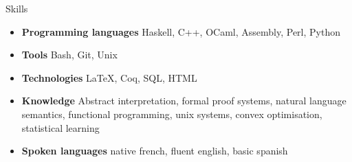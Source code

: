\documentclass[a4paper,14pt]{extarticle}
\newcommand{\cvtitle}[1]{
    \begin{tcolorbox}[colback=bgcol,colframe=ForestGreen,
        height=1cm, valign=center, sharp corners=downhill]
        {\Large #1}
    \end{tcolorbox}
}
\begin{document}
\begin{minipage}[c][282mm][t]{0.60\linewidth}
        \cvtitle{Skills}

        \begin{itemize}
            \item \textbf{Programming languages} Haskell, C++, OCaml, Assembly, Perl, Python
            \item \textbf{Tools} Bash, Git, Unix
            \item \textbf{Technologies} \LaTeX, Coq, SQL, HTML
            \item \textbf{Knowledge} Abstract interpretation, formal proof systems, natural language semantics,
                functional programming, unix systems, convex optimisation, statistical learning
            \item \textbf{Spoken languages} native french, fluent english, basic spanish
        \end{itemize}

    \end{minipage}
\end{document}
